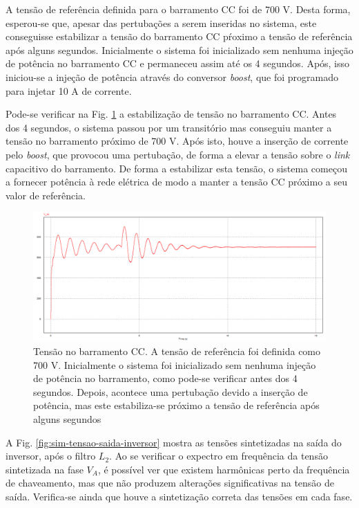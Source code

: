 A tensão de referência definida para o barramento CC foi de 700 V. Desta forma, esperou-se que, apesar das pertubações a serem inseridas no sistema, este conseguisse estabilizar a tensão do barramento CC pŕoximo a tensão de referência após alguns segundos. 
Inicialmente o sistema foi inicializado sem nenhuma injeção de potência no barramento CC e permaneceu assim até os 4 segundos. Após, isso iniciou-se a injeção de potência através do conversor \textit{boost}, que foi programado para injetar 10 A de corrente.

Pode-se verificar na Fig. \ref{fig:sim-tensao-barramento} a estabilização de tensão no barramento CC. 
Antes dos 4 segundos, o sistema passou por um transitório mas conseguiu manter a tensão no barramento próximo de 700 V. 
Após isto, houve a inserção de corrente pelo \textit{boost}, que provocou uma pertubação, de forma a elevar a tensão sobre o \textit{link} capacitivo do barramento.
De forma a estabilizar esta tensão, o sistema começou a fornecer potência à rede elétrica de modo a manter a tensão CC próximo a seu valor de referência.

\begin{figure}[!hbt]
	\begin{center}
    \includegraphics[width=\textwidth]{figuras/sim_figures/sistema_completo/tensao_barramento.PNG}
    \caption{Tensão no barramento CC. A tensão de referência foi definida como 700 V. Inicialmente o sistema foi inicializado sem nenhuma injeção de potência no barramento, como pode-se verificar antes dos 4 segundos. Depois, acontece uma pertubação devido a inserção de potência, mas este estabiliza-se próximo a tensão de referência após alguns segundos}
    \label{fig:sim-tensao-barramento}
    \end{center}
\end{figure}

A Fig. \ref{fig:sim-tensao-saida-inversor} mostra as tensões sintetizadas na saída do inversor, após o filtro $L_2$.
Ao se verificar o expectro em frequência da tensão sintetizada na fase $V_A$, é possível ver que existem harmônicas perto da frequência de chaveamento, mas que não produzem alterações significativas na tensão de saída. 
Verifica-se ainda que houve a sintetização correta das tensões em cada fase.

